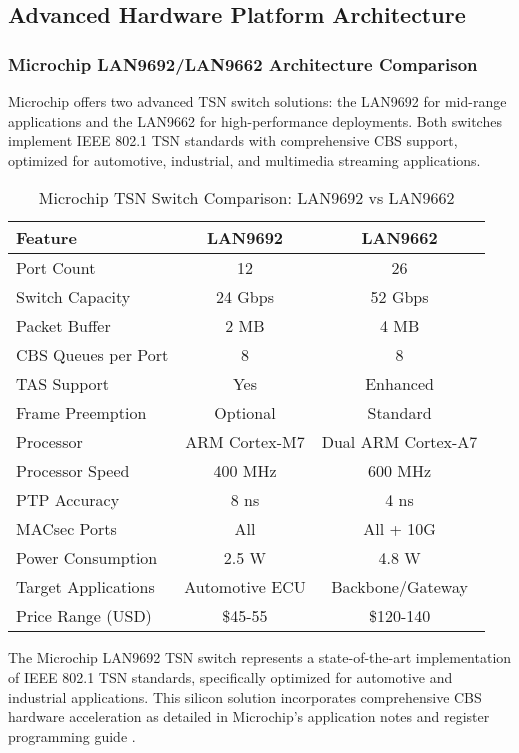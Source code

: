 \documentclass[10pt, journal, compsoc]{IEEEtran}
\begin{document}
\subsection{Advanced Hardware Platform Architecture}

\subsubsection{Microchip LAN9692/LAN9662 Architecture Comparison}

Microchip offers two advanced TSN switch solutions: the LAN9692 \cite{microchip2024lan9692} for mid-range applications and the LAN9662 \cite{microchip2024lan9662} for high-performance deployments. Both switches implement IEEE 802.1 TSN standards with comprehensive CBS support, optimized for automotive, industrial, and multimedia streaming applications.

\begin{table}[h]
\centering
\caption{Microchip TSN Switch Comparison: LAN9692 vs LAN9662}
\label{tab:microchip_comparison}
\begin{tabular}{lcc}
\toprule
\textbf{Feature} & \textbf{LAN9692} & \textbf{LAN9662} \\
\midrule
Port Count & 12 & 26 \\
Switch Capacity & 24 Gbps & 52 Gbps \\
Packet Buffer & 2 MB & 4 MB \\
CBS Queues per Port & 8 & 8 \\
TAS Support & Yes & Enhanced \\
Frame Preemption & Optional & Standard \\
Processor & ARM Cortex-M7 & Dual ARM Cortex-A7 \\
Processor Speed & 400 MHz & 600 MHz \\
PTP Accuracy & 8 ns & 4 ns \\
MACsec Ports & All & All + 10G \\
Power Consumption & 2.5 W & 4.8 W \\
Target Applications & Automotive ECU & Backbone/Gateway \\
Price Range (USD) & \$45-55 & \$120-140 \\
\bottomrule
\end{tabular}
\end{table}

The Microchip LAN9692 TSN switch represents a state-of-the-art implementation of IEEE 802.1 TSN standards, specifically optimized for automotive and industrial applications. This silicon solution incorporates comprehensive CBS hardware acceleration as detailed in Microchip's application notes \cite{microchip2024cbs_app} and register programming guide \cite{microchip2023register}.
\end{document}
